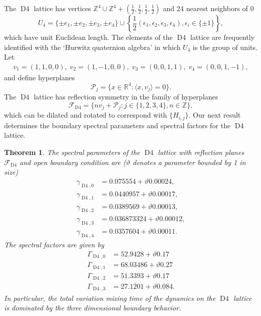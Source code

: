 \documentclass[a4paper, 12pt, notitlepage]{amsart}
\newcommand{\Dfour}{\operatorname{D4}}
\newcommand{\bR}{\mathbb{R}}
\newcommand{\zed}{\mathbb{Z}}
\newcommand{\sF}{\mathscr{F}}
\newcommand{\sP}{{\mathscr{P}}}
\newtheorem{theorem}{Theorem}
\theoremstyle{remark}
\begin{document}
 
The $\Dfour$ lattice has vertices $\zed^4 \cup \zed^4 + (\frac{1}{2}, \frac{1}{2}, \frac{1}{2}, \frac{1}{2})$ and 24 nearest neighbors of 0
\begin{equation}
U_4 = \{ \pm e_1, \pm e_2, \pm e_3 , \pm e_4\} \cup \left\{\frac{1}{2} (\epsilon_1, \epsilon_2, \epsilon_3, \epsilon_4), \epsilon_i \in \{\pm 1\}\right\},
\end{equation}
which have unit Euclidean length. The elements of the $\Dfour$ lattice are frequently identified with the `Hurwitz quaternion algebra' in which $U_4$ is the group of units.
 Let 
\begin{align*}v_1=(1,1,0,0),\; v_2=(1,-1,0,0),\; v_3 = (0,0,1,1),\; v_4 = (0,0,1,-1),
\end{align*}
 and define hyperplanes
\begin{equation*}
 \sP_j = \{x \in \bR^4: \langle x, v_j\rangle =0\}.
\end{equation*}
The $\Dfour$ lattice has reflection symmetry in the  family of hyperplanes
\begin{equation}
 \sF_{\Dfour} = \{ n v_j + \sP_j: j \in \{1, 2, 3, 4\}, n \in \zed\},
\end{equation}
which can be dilated and rotated to correspond with $\{H_{i,j}\}$.
Our next result determines the boundary spectral parameters and spectral factors for the $\Dfour$ lattice.

\begin{theorem}\label{D4_theorem}
The spectral parameters of the $\Dfour$ lattice with reflection planes $\sF_{\Dfour}$ and open boundary condition are ($\vartheta$ denotes a parameter bounded by 1 in size)
\begin{align*}
\gamma_{\Dfour, 0} &= 0.075554+ \vartheta 0.00024, \\
\gamma_{\Dfour, 1} &= 0.0440957 +\vartheta 0.00017, \\
\gamma_{\Dfour, 2} &= 0.0389569 +\vartheta 0.00013, \\
\gamma_{\Dfour, 3} &= 0.036873324 +\vartheta 0.00012, \\
\gamma_{\Dfour, 4} &= 0.0357604+ \vartheta 0.00011.
\end{align*}
The spectral factors are given by
\begin{align*}
 \Gamma_{\Dfour,0}  &= 52.9428 + \vartheta 0.17\\
 \Gamma_{\Dfour,1}  &= 68.03486+ \vartheta 0.27\\
 \Gamma_{\Dfour,2}  &=  51.3393 + \vartheta 0.17\\
 \Gamma_{\Dfour,3}  &= 27.1201 + \vartheta 0.084.
\end{align*}
In particular, the total variation mixing time of the dynamics on the $\Dfour$ lattice is dominated by the three dimensional boundary behavior.
\end{theorem}
\end{document}
